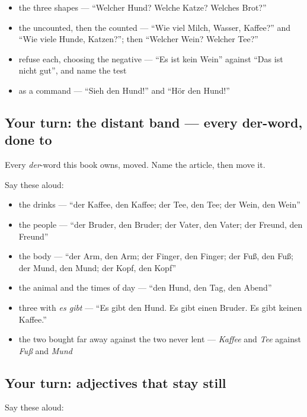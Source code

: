 \begin{itemize}
\raggedright
  \item the three shapes — \textquotedblleft{}Welcher Hund? Welche Katze? Welches Brot?\textquotedblright{}
  \item the uncounted, then the counted — \textquotedblleft{}Wie viel Milch, Wasser, Kaffee?\textquotedblright{} and \textquotedblleft{}Wie viele Hunde, Katzen?\textquotedblright{}; then \textquotedblleft{}Welcher Wein? Welcher Tee?\textquotedblright{}
  \item refuse each, choosing the negative — \textquotedblleft{}Es ist kein Wein\textquotedblright{} against \textquotedblleft{}Das ist nicht gut\textquotedblright{}, and name the test
  \item as a command — \textquotedblleft{}Sieh den Hund!\textquotedblright{} and \textquotedblleft{}Hör den Hund!\textquotedblright{}
\end{itemize}

\subsection*{Your turn: the distant band — every der-word, done to}
Every \emph{der}-word this book owns, moved. Name the article, then move it.

Say these aloud:

\begin{itemize}
\raggedright
  \item the drinks — \textquotedblleft{}der Kaffee, den Kaffee; der Tee, den Tee; der Wein, den Wein\textquotedblright{}
  \item the people — \textquotedblleft{}der Bruder, den Bruder; der Vater, den Vater; der Freund, den Freund\textquotedblright{}
  \item the body — \textquotedblleft{}der Arm, den Arm; der Finger, den Finger; der Fuß, den Fuß; der Mund, den Mund; der Kopf, den Kopf\textquotedblright{}
  \item the animal and the times of day — \textquotedblleft{}den Hund, den Tag, den Abend\textquotedblright{}
  \item three with \emph{es gibt} — \textquotedblleft{}Es gibt den Hund. Es gibt einen Bruder. Es gibt keinen Kaffee.\textquotedblright{}
  \item the two bought far away against the two never lent — \emph{Kaffee} and \emph{Tee} against \emph{Fuß} and \emph{Mund}
\end{itemize}

\subsection*{Your turn: adjectives that stay still}
Say these aloud:

